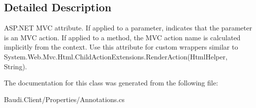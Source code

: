 \subsection{Detailed Description}
A\+S\+P.\+N\+E\+T M\+V\+C attribute. If applied to a parameter, indicates that the parameter is an M\+V\+C action. If applied to a method, the M\+V\+C action name is calculated implicitly from the context. Use this attribute for custom wrappers similar to {\ttfamily System.\+Web.\+Mvc.\+Html.\+Child\+Action\+Extensions.\+Render\+Action(\+Html\+Helper, String)}. 



The documentation for this class was generated from the following file\+:\begin{DoxyCompactItemize}
\item 
Baudi.\+Client/\+Properties/Annotations.\+cs\end{DoxyCompactItemize}
